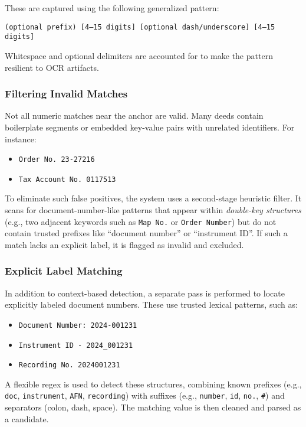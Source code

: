 \documentclass{article}
\begin{document}
These are captured using the following generalized pattern:

\begin{center}
\texttt{(optional prefix) [4–15 digits] [optional dash/underscore] [4–15 digits]}
\end{center}

Whitespace and optional delimiters are accounted for to make the pattern resilient to OCR artifacts.

\subsubsection{Filtering Invalid Matches}

Not all numeric matches near the anchor are valid. Many deeds contain boilerplate segments or embedded key-value pairs with unrelated identifiers. For instance:

\begin{itemize}
    \item \texttt{Order No. 23-27216}
    \item \texttt{Tax Account No. 0117513}
\end{itemize}

To eliminate such false positives, the system uses a second-stage heuristic filter. It scans for document-number-like patterns that appear within \textit{double-key structures} (e.g., two adjacent keywords such as \texttt{Map No.} or \texttt{Order Number}) but do not contain trusted prefixes like ``document number'' or ``instrument ID''. If such a match lacks an explicit label, it is flagged as invalid and excluded.

\subsubsection{Explicit Label Matching}

In addition to context-based detection, a separate pass is performed to locate explicitly labeled document numbers. These use trusted lexical patterns, such as:

\begin{itemize}
    \item \texttt{Document Number: 2024-001231}
    \item \texttt{Instrument ID - 2024\_001231}
    \item \texttt{Recording No. 2024001231}
\end{itemize}

A flexible regex is used to detect these structures, combining known prefixes (e.g., \texttt{doc}, \texttt{instrument}, \texttt{AFN}, \texttt{recording}) with suffixes (e.g., \texttt{number}, \texttt{id}, \texttt{no.}, \texttt{\#}) and separators (colon, dash, space). The matching value is then cleaned and parsed as a candidate.
\end{document}
